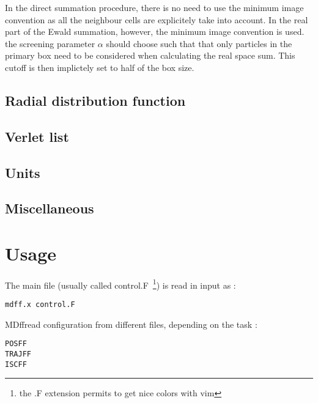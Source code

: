 \documentclass[a4paper]{article}
\newcommand{\MDFF}{{\sc MDff}}
\begin{document}
In the direct summation procedure, there is no need to use the minimum
 image convention as all the neighbour cells are explicitely take into account.
In the real part of the Ewald summation, however, the minimum image convention
is used. the screening parameter $\alpha$ should choose such that that only particles
in the primary box need to be considered when calculating the real space sum.
This cutoff is then implictely set to half of the box size.


\subsection{Radial distribution function\label{sec:GR}}

\subsection{Verlet list\label{sec:vnlist}}

\subsection{Units \label{sec:units}}

\subsection{Miscellaneous \label{sec:misc}}

\section{Usage}

The main file (usually called control.F~\footnote{the .F extension permits to get nice colors with vim}) is read in input as :
\begin{verbatim}
mdff.x control.F
\end{verbatim}

\MDFF read configuration from different files, depending on the task :
\begin{verbatim}
POSFF
TRAJFF
ISCFF
\end{verbatim}
\end{document}
